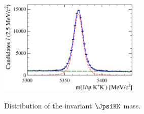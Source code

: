 
\begin{figure}[htbp]
  \centering
  \includegraphics[width=0.6\textwidth]{graphics/experiment/JpsiKK_mass}
  \label{fig:ana_model_mass_JpsiKKMass}
  \caption{Distribution of the invariant $\JpsiKK$ mass.}
\end{figure}


